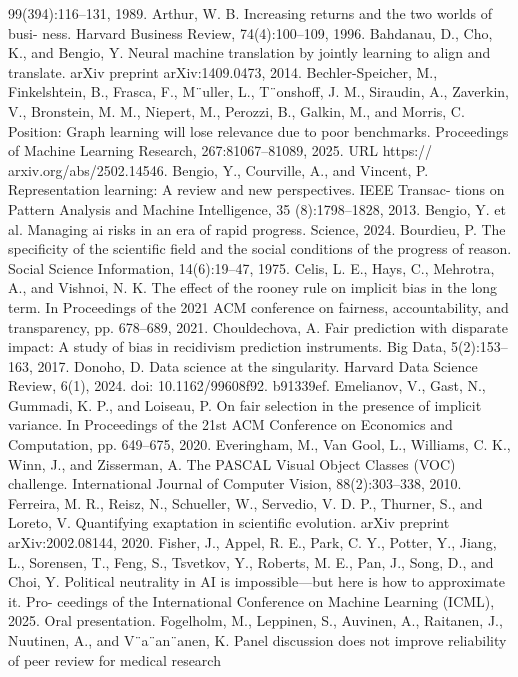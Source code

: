 99(394):116–131, 1989.
Arthur, W. B. Increasing returns and the two worlds of busi-
ness. Harvard Business Review, 74(4):100–109, 1996.
Bahdanau, D., Cho, K., and Bengio, Y. Neural machine
translation by jointly learning to align and translate. arXiv
preprint arXiv:1409.0473, 2014.
Bechler-Speicher, M., Finkelshtein, B., Frasca, F., M¨uller,
L., T¨onshoff, J. M., Siraudin, A., Zaverkin, V., Bronstein,
M. M., Niepert, M., Perozzi, B., Galkin, M., and Morris,
C. Position: Graph learning will lose relevance due to
poor benchmarks. Proceedings of Machine Learning
Research, 267:81067–81089, 2025. URL https://
arxiv.org/abs/2502.14546.
Bengio, Y., Courville, A., and Vincent, P. Representation
learning: A review and new perspectives. IEEE Transac-
tions on Pattern Analysis and Machine Intelligence, 35
(8):1798–1828, 2013.
Bengio, Y. et al.
Managing ai risks in an era of rapid
progress. Science, 2024.
Bourdieu, P. The specificity of the scientific field and the
social conditions of the progress of reason. Social Science
Information, 14(6):19–47, 1975.
Celis, L. E., Hays, C., Mehrotra, A., and Vishnoi, N. K. The
effect of the rooney rule on implicit bias in the long term.
In Proceedings of the 2021 ACM conference on fairness,
accountability, and transparency, pp. 678–689, 2021.
Chouldechova, A. Fair prediction with disparate impact: A
study of bias in recidivism prediction instruments. Big
Data, 5(2):153–163, 2017.
Donoho, D. Data science at the singularity. Harvard Data
Science Review, 6(1), 2024.
doi: 10.1162/99608f92.
b91339ef.
Emelianov, V., Gast, N., Gummadi, K. P., and Loiseau, P.
On fair selection in the presence of implicit variance. In
Proceedings of the 21st ACM Conference on Economics
and Computation, pp. 649–675, 2020.
Everingham, M., Van Gool, L., Williams, C. K., Winn, J.,
and Zisserman, A. The PASCAL Visual Object Classes
(VOC) challenge. International Journal of Computer
Vision, 88(2):303–338, 2010.
Ferreira, M. R., Reisz, N., Schueller, W., Servedio, V. D. P.,
Thurner, S., and Loreto, V. Quantifying exaptation in
scientific evolution. arXiv preprint arXiv:2002.08144,
2020.
Fisher, J., Appel, R. E., Park, C. Y., Potter, Y., Jiang, L.,
Sorensen, T., Feng, S., Tsvetkov, Y., Roberts, M. E.,
Pan, J., Song, D., and Choi, Y. Political neutrality in AI
is impossible—but here is how to approximate it. Pro-
ceedings of the International Conference on Machine
Learning (ICML), 2025. Oral presentation.
Fogelholm, M., Leppinen, S., Auvinen, A., Raitanen, J.,
Nuutinen, A., and V¨a¨an¨anen, K. Panel discussion does
not improve reliability of peer review for medical research

